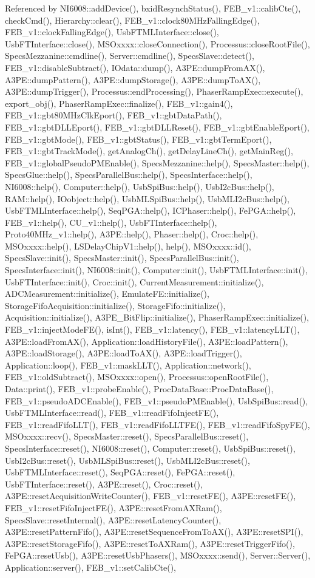 Referenced by NI6008::addDevice(), bxidResynchStatus(), FEB\_\-v1::calibCte(), checkCmd(), Hierarchy::clear(), FEB\_\-v1::clock80MHzFallingEdge(), FEB\_\-v1::clockFallingEdge(), UsbFTMLInterface::close(), UsbFTInterface::close(), MSOxxxx::closeConnection(), Processus::closeRootFile(), SpecsMezzanine::cmdline(), Server::cmdline(), SpecsSlave::detect(), FEB\_\-v1::disableSubtract(), IOdata::dump(), A3PE::dumpFromAX(), A3PE::dumpPattern(), A3PE::dumpStorage(), A3PE::dumpToAX(), A3PE::dumpTrigger(), Processus::endProcessing(), PhaserRampExec::execute(), export\_\-obj(), PhaserRampExec::finalize(), FEB\_\-v1::gain4(), FEB\_\-v1::gbt80MHzClkEport(), FEB\_\-v1::gbtDataPath(), FEB\_\-v1::gbtDLLEport(), FEB\_\-v1::gbtDLLReset(), FEB\_\-v1::gbtEnableEport(), FEB\_\-v1::gbtMode(), FEB\_\-v1::gbtStatus(), FEB\_\-v1::gbtTermEport(), FEB\_\-v1::gbtTrackMode(), getAnalogCh(), getDelayLineCh(), getMainReg(), FEB\_\-v1::globalPseudoPMEnable(), SpecsMezzanine::help(), SpecsMaster::help(), SpecsGlue::help(), SpecsParallelBus::help(), SpecsInterface::help(), NI6008::help(), Computer::help(), UsbSpiBus::help(), UsbI2cBus::help(), RAM::help(), IOobject::help(), UsbMLSpiBus::help(), UsbMLI2cBus::help(), UsbFTMLInterface::help(), SeqPGA::help(), ICPhaser::help(), FePGA::help(), FEB\_\-v1::help(), CU\_\-v1::help(), UsbFTInterface::help(), Proto40MHz\_\-v1::help(), A3PE::help(), Phaser::help(), Croc::help(), MSOxxxx::help(), LSDelayChipV1::help(), help(), MSOxxxx::id(), SpecsSlave::init(), SpecsMaster::init(), SpecsParallelBus::init(), SpecsInterface::init(), NI6008::init(), Computer::init(), UsbFTMLInterface::init(), UsbFTInterface::init(), Croc::init(), CurrentMeasurement::initialize(), ADCMeasurement::initialize(), EmulateFE::initialize(), StorageFifoAcquisition::initialize(), StorageFifo::initialize(), Acquisition::initialize(), A3PE\_\-BitFlip::initialize(), PhaserRampExec::initialize(), FEB\_\-v1::injectModeFE(), isInt(), FEB\_\-v1::latency(), FEB\_\-v1::latencyLLT(), A3PE::loadFromAX(), Application::loadHistoryFile(), A3PE::loadPattern(), A3PE::loadStorage(), A3PE::loadToAX(), A3PE::loadTrigger(), Application::loop(), FEB\_\-v1::maskLLT(), Application::network(), FEB\_\-v1::oldSubtract(), MSOxxxx::open(), Processus::openRootFile(), Data::print(), FEB\_\-v1::probeEnable(), ProcDataBase::ProcDataBase(), FEB\_\-v1::pseudoADCEnable(), FEB\_\-v1::pseudoPMEnable(), UsbSpiBus::read(), UsbFTMLInterface::read(), FEB\_\-v1::readFifoInjectFE(), FEB\_\-v1::readFifoLLT(), FEB\_\-v1::readFifoLLTFE(), FEB\_\-v1::readFifoSpyFE(), MSOxxxx::recv(), SpecsMaster::reset(), SpecsParallelBus::reset(), SpecsInterface::reset(), NI6008::reset(), Computer::reset(), UsbSpiBus::reset(), UsbI2cBus::reset(), UsbMLSpiBus::reset(), UsbMLI2cBus::reset(), UsbFTMLInterface::reset(), SeqPGA::reset(), FePGA::reset(), UsbFTInterface::reset(), A3PE::reset(), Croc::reset(), A3PE::resetAcquisitionWriteCounter(), FEB\_\-v1::resetFE(), A3PE::resetFE(), FEB\_\-v1::resetFifoInjectFE(), A3PE::resetFromAXRam(), SpecsSlave::resetInternal(), A3PE::resetLatencyCounter(), A3PE::resetPatternFifo(), A3PE::resetSequenceFromToAX(), A3PE::resetSPI(), A3PE::resetStorageFifo(), A3PE::resetToAXRam(), A3PE::resetTriggerFifo(), FePGA::resetUsb(), A3PE::resetUsbPhasers(), MSOxxxx::send(), Server::Server(), Application::server(), FEB\_\-v1::setCalibCte(), 